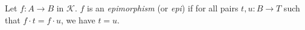 Let $f: A \longrightarrow B$ in $\mathcal{K}$. $f$ is an \textit{epimorphism} (or \textit{epi}) if for all pairs $t, u: B \longrightarrow T$ such that $f \cdot t = f \cdot u$, we have $t = u$.
